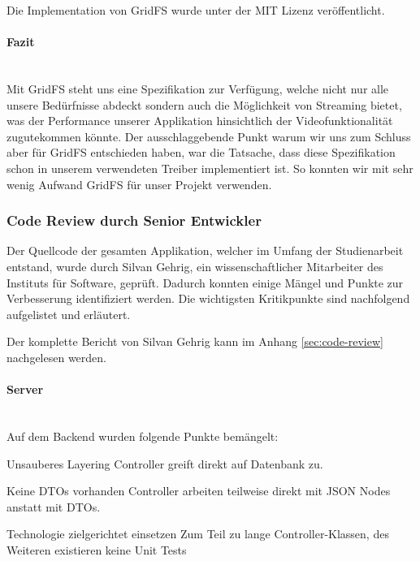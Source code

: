 Die Implementation von GridFS wurde unter der MIT Lizenz veröffentlicht.

\paragraph{Fazit}~\\
Mit GridFS steht uns eine Spezifikation zur Verfügung, welche nicht nur alle unsere Bedürfnisse abdeckt sondern auch die Möglichkeit von Streaming bietet, was der Performance unserer Applikation hinsichtlich der Videofunktionalität zugutekommen könnte. Der ausschlaggebende Punkt warum wir uns zum Schluss aber für GridFS entschieden haben, war die Tatsache, dass diese Spezifikation schon in unserem verwendeten Treiber implementiert ist. So konnten wir mit sehr wenig Aufwand GridFS für unser Projekt verwenden.
\newpage

\subsubsection{Code Review durch Senior Entwickler}
Der Quellcode der gesamten Applikation, welcher im Umfang der Studienarbeit entstand, wurde durch Silvan Gehrig, ein wissenschaftlicher Mitarbeiter des Instituts für Software, geprüft. Dadurch konnten einige Mängel und Punkte zur Verbesserung identifiziert werden. Die wichtigsten Kritikpunkte sind nachfolgend aufgelistet und erläutert.

Der komplette Bericht von Silvan Gehrig kann im Anhang \ref{sec:code-review} nachgelesen werden.

\paragraph{Server}~\\
Auf dem Backend wurden folgende Punkte bemängelt:
\begin{basedescript}{
		\desclabelstyle{\multilinelabel}
		\desclabelwidth{4.5cm}
		\setlength{\itemsep}{5ex}}
		\item[Unsauberes Layering] Controller greift direkt auf Datenbank zu.
		\item[Keine DTOs vorhanden] Controller arbeiten teilweise direkt mit JSON Nodes anstatt mit DTOs.
		
		\item[Technologie zielgerichtet einsetzen] Zum Teil zu lange Controller-Klassen, des Weiteren existieren keine Unit Tests
		
\end{basedescript}
